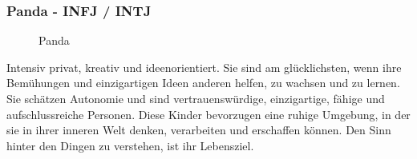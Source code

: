 \subsubsection{Panda - INFJ / INTJ}
\begin{figure}[H]
	\centering
	\caption[Panda]{Panda \cite{knowAndLove}}
	\label{img:Panda}
\end{figure}
\glqq Intensiv privat, kreativ und ideenorientiert. Sie sind am glücklichsten, wenn ihre Bemühungen und einzigartigen Ideen anderen helfen, zu wachsen und zu lernen. Sie schätzen Autonomie und sind vertrauenswürdige, einzigartige, fähige und aufschlussreiche Personen. Diese Kinder bevorzugen eine ruhige Umgebung, in der sie in ihrer inneren Welt denken, verarbeiten und erschaffen können. Den Sinn hinter den Dingen zu verstehen, ist ihr Lebensziel. \grqq \cite{knowAndLove}




